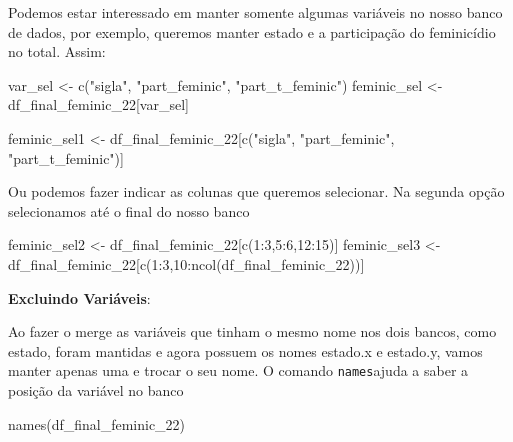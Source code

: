 \documentclass[
  letterpaper,
  DIV=11,
  numbers=noendperiod]{scrreprt}
\newenvironment{Shaded}{\begin{snugshade}}{\end{snugshade}}
\newcommand{\DecValTok}[1]{\textcolor[rgb]{0.68,0.00,0.00}{#1}}
\newcommand{\FunctionTok}[1]{\textcolor[rgb]{0.28,0.35,0.67}{#1}}
\newcommand{\NormalTok}[1]{\textcolor[rgb]{0.00,0.23,0.31}{#1}}
\newcommand{\OtherTok}[1]{\textcolor[rgb]{0.00,0.23,0.31}{#1}}
\newcommand{\SpecialCharTok}[1]{\textcolor[rgb]{0.37,0.37,0.37}{#1}}
\newcommand{\StringTok}[1]{\textcolor[rgb]{0.13,0.47,0.30}{#1}}
\begin{document}
Podemos estar interessado em manter somente algumas variáveis no nosso
banco de dados, por exemplo, queremos manter estado e a participação do
feminicídio no total. Assim:

\begin{Shaded}
\begin{Highlighting}[]
\NormalTok{var\_sel }\OtherTok{\textless{}{-}} \FunctionTok{c}\NormalTok{(}\StringTok{"sigla"}\NormalTok{, }\StringTok{"part\_feminic"}\NormalTok{, }\StringTok{"part\_t\_feminic"}\NormalTok{)}
\NormalTok{feminic\_sel }\OtherTok{\textless{}{-}}\NormalTok{ df\_final\_feminic\_22[var\_sel]}

\NormalTok{feminic\_sel1 }\OtherTok{\textless{}{-}}\NormalTok{ df\_final\_feminic\_22[}\FunctionTok{c}\NormalTok{(}\StringTok{"sigla"}\NormalTok{, }\StringTok{"part\_feminic"}\NormalTok{, }\StringTok{"part\_t\_feminic"}\NormalTok{)]}
\end{Highlighting}
\end{Shaded}

Ou podemos fazer indicar as colunas que queremos selecionar. Na segunda
opção selecionamos até o final do nosso banco

\begin{Shaded}
\begin{Highlighting}[]
\NormalTok{feminic\_sel2 }\OtherTok{\textless{}{-}}\NormalTok{ df\_final\_feminic\_22[}\FunctionTok{c}\NormalTok{(}\DecValTok{1}\SpecialCharTok{:}\DecValTok{3}\NormalTok{,}\DecValTok{5}\SpecialCharTok{:}\DecValTok{6}\NormalTok{,}\DecValTok{12}\SpecialCharTok{:}\DecValTok{15}\NormalTok{)]}
\NormalTok{feminic\_sel3 }\OtherTok{\textless{}{-}}\NormalTok{ df\_final\_feminic\_22[}\FunctionTok{c}\NormalTok{(}\DecValTok{1}\SpecialCharTok{:}\DecValTok{3}\NormalTok{,}\DecValTok{10}\SpecialCharTok{:}\FunctionTok{ncol}\NormalTok{(df\_final\_feminic\_22))]}
\end{Highlighting}
\end{Shaded}

\textbf{Excluindo Variáveis}:

Ao fazer o merge as variáveis que tinham o mesmo nome nos dois bancos,
como estado, foram mantidas e agora possuem os nomes estado.x e
estado.y, vamos manter apenas uma e trocar o seu nome. O comando
\texttt{names}ajuda a saber a posição da variável no banco

\begin{Shaded}
\begin{Highlighting}[]
\FunctionTok{names}\NormalTok{(df\_final\_feminic\_22)}
\end{Highlighting}
\end{Shaded}
\end{document}
